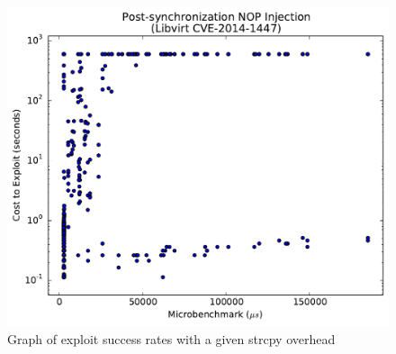 \documentclass[letterpaper,twocolumn,10pt]{article}
\begin{document}
\begin{figure}
\centering
\includegraphics[width=\textwidth]{figures/libvirt-post}
\caption{Graph of exploit success rates with a given strcpy overhead}
\label{fig_libvirt-post}
\end{figure}

{\footnotesize 
}
\end{document}
